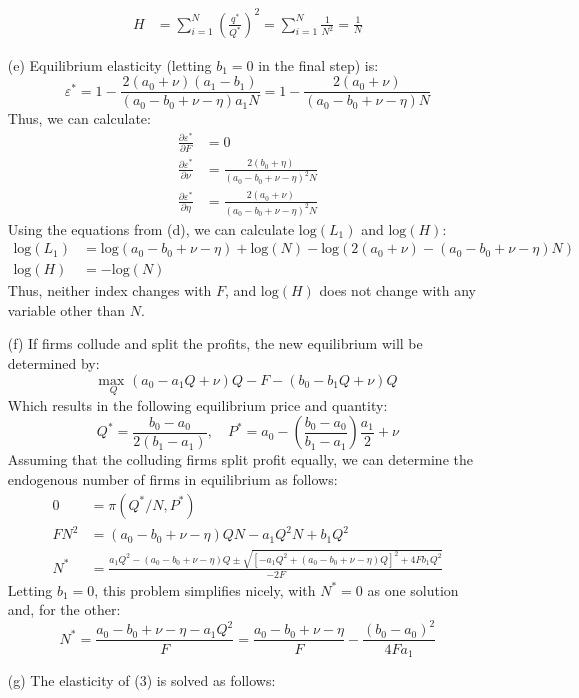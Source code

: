 \documentclass{article}
\newcommand{\loge}[1]{\text{log}\left(#1\right)}
\newcommand{\usmax}[1]{\underset{#1}{\text{max }}}
\newcommand{\pl}{\partial}
\begin{document}
\begin{itemize}
\begin{align*}
      H &= \sum_{i=1}^N\left(\frac{q^*}{Q^*}\right)^2 = \sum_{i=1}^N\frac{1}{N^2} = \frac{1}{N}
    \end{align*} 
    \item[(e)] Equilibrium elasticity (letting ${b_1=0}$ in the final step) is: \[
      \varepsilon^* = 1-\frac{2(a_0+\nu)(a_1-b_1)}{(a_0-b_0+\nu-\eta)a_1N}
      = 1 - \frac{2(a_0+\nu)}{(a_0-b_0+\nu-\eta)N}
    \]
    Thus, we can calculate:\begin{align*}
      \frac{\pl\varepsilon^*}{\pl F}    &= 0                                        \\
      \frac{\pl\varepsilon^*}{\pl \nu}  &= \frac{2(b_0+\eta)}{(a_0-b_0+\nu-\eta)^2N} \\
      \frac{\pl\varepsilon^*}{\pl \eta} &= \frac{2(a_0+\nu)}{(a_0-b_0+\nu-\eta)^2N} 
    \end{align*}
    Using the equations from (d), we can calculate $\loge{L_1}$ and $\loge{H}$:\begin{align*}
      \loge{L_1}  &= \loge{a_0-b_0+\nu-\eta} + \loge{N} - \loge{2(a_0+\nu)-(a_0-b_0+\nu-\eta)N} \\
      \loge{H}    &= -\loge{N}
    \end{align*}
    Thus, neither index changes with $F$, and $\loge{H}$ does not change with any variable other than $N$.
    \item[(f)] If firms collude and split the profits, the new equilibrium will be determined by: \[
      \usmax{Q}(a_0-a_1Q+\nu)Q - F - (b_0-b_1Q + \nu)Q
    \]
    Which results in the following equilibrium price and quantity:\[
      Q^* = \frac{b_0-a_0}{2(b_1-a_1)},\quad P^* = a_0 - \left(\frac{b_0-a_0}{b_1-a_1}\right)\frac{a_1}{2} + \nu
    \]
    Assuming that the colluding firms split profit equally, we can determine the endogenous number of firms in equilibrium as follows:\begin{align*}
      0 &= \pi(Q^*/N,P^*)                                    \\
      FN^2 &= (a_0 - b_0 + \nu - \eta)QN - a_1Q^2N + b_1Q^2 \\
      N^* &= \frac{a_1Q^2-(a_0-b_0+\nu-\eta)Q\pm\sqrt{[-a_1Q^2+(a_0-b_0+\nu-\eta)Q]^2+4Fb_1Q^2}}{-2F}
    \end{align*}
    Letting ${b_1=0}$, this problem simplifies nicely, with $N^*=0$ as one solution and, for the other:\[
      N^* = \frac{a_0 - b_0 + \nu - \eta - a_1Q^2}{F} 
          = \frac{a_0 - b_0 + \nu - \eta}{F} - \frac{(b_0-a_0)^2}{4Fa_1}
    \]
    \item[(g)] The elasticity of (3) is solved as follows: \begin{align*}

\end{align*}
\end{itemize}
\end{document}
